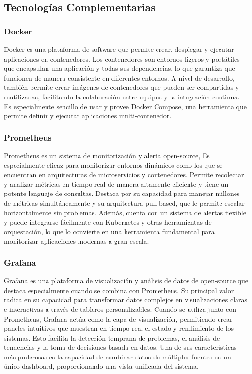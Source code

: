 \subsection{Tecnologías Complementarias}

\subsubsection{Docker}

Docker es una plataforma de software que permite crear, desplegar y ejecutar aplicaciones en contenedores. 
Los contenedores son entornos ligeros y portátiles que encapsulan una aplicación y todas sus dependencias, lo que garantiza que funcionen de manera consistente en diferentes entornos.
A nivel de desarrollo, también permite crear imágenes de contenedores que pueden ser compartidas y reutilizadas, facilitando la colaboración entre equipos y la integración continua.
Es especialmente sencillo de usar y provee Docker Compose, una herramienta que permite definir y ejecutar aplicaciones multi-contenedor.

\subsubsection{Prometheus}
Prometheus es un sistema de monitorización y alerta open-source, Es especialmente eficaz para monitorizar entornos dinámicos como los que se encuentran en arquitecturas de microservicios y contenedores.
Permite recolectar y analizar métricas en tiempo real de manera altamente eficiente y tiene un potente lenguaje de consultas. 
Destaca por su capacidad para manejar millones de métricas simultáneamente y su arquitectura pull-based, que le permite escalar horizontalmente sin problemas. 
Además, cuenta con un sistema de alertas flexible y puede integrarse fácilmente con Kubernetes y otras herramientas de orquestación, 
lo que lo convierte en una herramienta fundamental para monitorizar aplicaciones modernas a gran escala.

\subsubsection{Grafana}
Grafana es una plataforma de visualización y análisis de datos de open-source que destaca especialmente cuando se combina con Prometheus. 
Su principal valor radica en su capacidad para transformar datos complejos en visualizaciones claras e interactivas a través de tableros personalizables.
Cuando se utiliza junto con Prometheus, Grafana actúa como la capa de visualización, permitiendo crear paneles intuitivos que muestran en tiempo real el estado y rendimiento de los sistemas. 
Esto facilita la detección temprana de problemas, el análisis de tendencias y la toma de decisiones basada en datos. 
Una de sus características más poderosas es la capacidad de combinar datos de múltiples fuentes en un único dashboard, proporcionando una vista unificada del sistema. 

\newpage